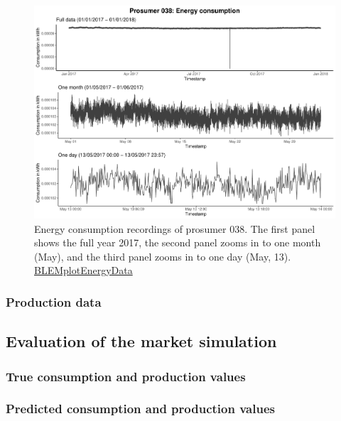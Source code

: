 \begin{figure}[htbp]
 \centering
\includegraphics[width=\textwidth]{thesis/graphs/timeseries/p038_cons.pdf}
\caption[Energy consumption recordings of prosumer 038]{Energy consumption recordings of prosumer 038. The first panel shows the full year 2017, the second panel zooms in to one month (May), and the third panel zooms in to one day (May, 13). \quantnet\href{ }{BLEMplotEnergyData}}
\label{Fig:energycons_p038}
\end{figure}

\subsubsection{Production data}





\subsection{Evaluation of the market simulation}\label{Sec:Results;Subsec:Simulation}



\subsubsection{True consumption and production values}



\subsubsection{Predicted consumption and production values}



